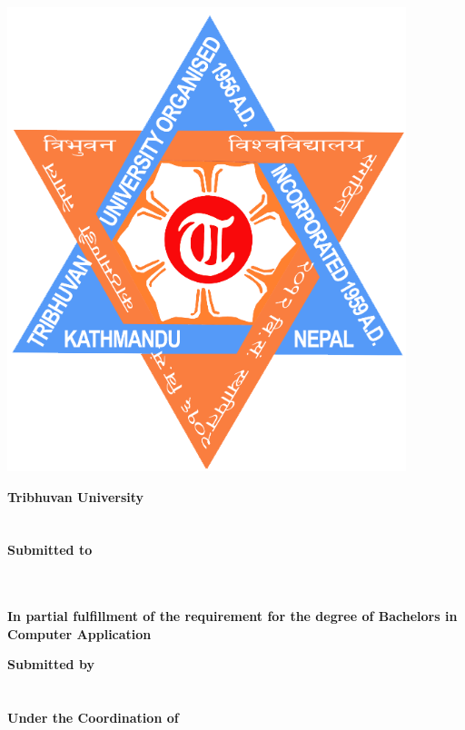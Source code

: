 \begin{center}
\begin{spacing}{1.6}
\thispagestyle{empty}

\includegraphics[scale=0.25]{img/Graphics/TUlogo.png}

\textbf{
\large{Tribhuvan University}\\
\large{\theinstitute}}\\
\vspace{0.5cm}
\textbf{\MakeUppercase{\thetitle}\\
\vspace{0.5cm} 
Submitted to\\ 
\thedepartment\\
\thecampus}\\
\vspace{0.5cm}

\textbf{In partial fulfillment of the requirement for the degree of Bachelors in Computer Application}
\bigskip

\par

\textbf{
Submitted by\\
\theauthor\\
\MakeUppercase{\thedate}}\\
\vspace{1cm}
\textbf{
Under the Coordination of\\
\thesupervisor
}
\end{spacing}
\end{center}

\clearpage